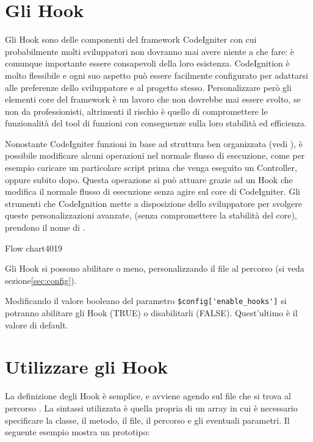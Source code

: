 \section{Gli Hook}
\label{cap:hook}

Gli Hook sono delle componenti del framework CodeIgniter con cui probabilmente molti sviluppatori non dovranno mai avere niente a che fare: è comunque importante essere consapevoli della loro esistenza. CodeIgnition è molto flessibile e ogni suo aspetto può essere facilmente configurato per adattarsi alle preferenze dello sviluppatore e al progetto stesso. Personalizzare però gli elementi core del framework è un lavoro che non dovrebbe mai essere svolto, se non da professionisti, altrimenti il rischio è quello di compromettere le funzionalità del tool di funzioni con conseguenze sulla loro stabilità ed efficienza.
 
Nonostante CodeIgniter funzioni in base ad struttura ben organizzata (vedi ), è possibile modificare alcuni operazioni nel normale flusso di esecuzione, come per esempio caricare un particolare script prima che venga eseguito un Controller, oppure subito dopo. Questa operazione si può attuare grazie ad un Hook che modifica il normale flusso di esecuzione senza agire sul core di CodeIgniter. Gli strumenti che CodeIgnition mette a disposizione dello sviluppatore per svolgere queste personalizzazioni avanzate, (senza compromettere la stabilità del core), prendono il nome di .

\begin{img}{Flow chart}{4}{019}
\end{img}

Gli Hook si possono abilitare o meno, personalizzando il file  al percorso  (si veda sezione\vref{sec:config}).

Modificando il valore booleano del parametro \verb|$config['enable_hooks']| si potranno abilitare gli Hook (TRUE) o disabilitarli (FALSE). Quest'ultimo è il valore di default.

\section*{Utilizzare gli Hook}
La definizione degli Hook è semplice, e avviene agendo sul file  che si trova al percorso . La sintassi utilizzata è quella propria di un array in cui è necessario specificare la classe, il metodo, il file, il percorso e gli eventuali parametri. Il seguente esempio mostra un prototipo:

